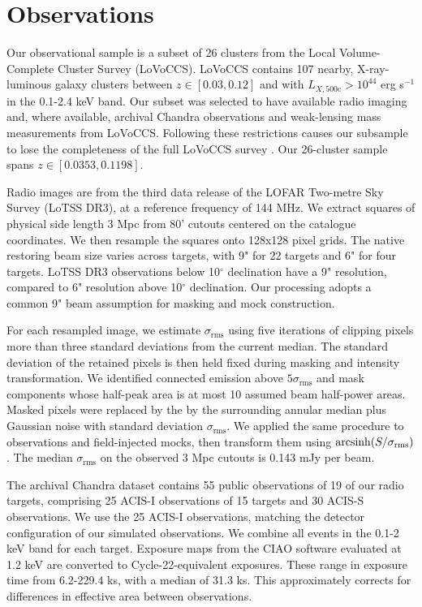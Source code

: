 \section{Observations}
\label{sec:obs}


Our observational sample is a subset of 26 clusters from the Local Volume-Complete Cluster Survey (LoVoCCS).
LoVoCCS contains 107 nearby, X-ray-luminous galaxy clusters between $z \in [0.03, 0.12]$ and with $L_{X,\text{500c}} > 10^{44}$ erg s$^{-1}$ in the 0.1-2.4 keV band.
Our subset was selected to have available radio imaging and, where available, archival Chandra observations and weak-lensing mass measurements from LoVoCCS.
Following these restrictions causes our subsample to lose the completeness of the full LoVoCCS survey \citep{Fu2024}.
Our 26-cluster sample spans $z \in [0.0353, 0.1198]$.

Radio images are from the third data release of the LOFAR Two-metre Sky Survey (LoTSS DR3), at a reference frequency of 144 MHz.
We extract squares of physical side length 3 Mpc from 80' cutouts centered on the catalogue coordinates.
We then resample the squares onto 128x128 pixel grids.
The native restoring beam size varies across targets, with 9" for 22 targets and 6" for four targets.
LoTSS DR3 observations below 10$^\circ$ declination have a 9" resolution, compared to 6" resolution above 10$^\circ$ declination.
Our processing adopts a common 9" beam assumption for masking and mock construction.

For each resampled image, we estimate $\sigma_\text{rms}$ using five iterations of clipping pixels more than three standard deviations from the current median.
The standard deviation of the retained pixels is then held fixed during masking and intensity transformation.
We identified connected emission above $5\sigma_\text{rms}$ and mask components whose half-peak area is at most 10 assumed beam half-power areas.
Masked pixels were replaced by the by the surrounding annular median plus Gaussian noise with standard deviation $\sigma_\text{rms}$.
We applied the same procedure to observations and field-injected mocks, then transform them using $\operatorname{arcsinh}(S/\sigma_{\rm rms})$.
The median $\sigma_\text{rms}$ on the observed 3 Mpc cutouts is 0.143 mJy per beam.

The archival Chandra dataset contains 55 public observations of 19 of our radio targets, comprising 25 ACIS-I observations of 15 targets and 30 ACIS-S observations.
We use the 25 ACIS-I observations, matching the detector configuration of our simulated observations.
We combine all events in the 0.1-2 keV band for each target.
Exposure maps from the CIAO software evaluated at 1.2 keV are converted to Cycle-22-equivalent exposures.
These range in exposure time from 6.2-229.4 ks, with a median of 31.3 ks.
This approximately corrects for differences in effective area between observations.

